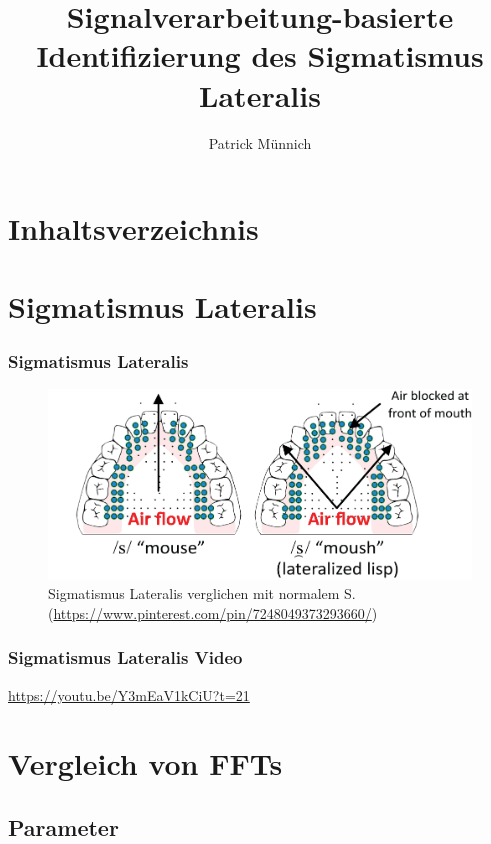 \documentclass[11pt]{beamer}
\author{Patrick M\"unnich}
\title{Signalverarbeitung-basierte Identifizierung des Sigmatismus Lateralis}
\institute{Hochschule D\"usseldorf}
\begin{document}
\begin{frame}
\titlepage
\end{frame}

\section{Inhaltsverzeichnis}

\begin{frame}
\tableofcontents
\end{frame}

\section{Sigmatismus Lateralis}

\begin{frame}
\frametitle{Sigmatismus Lateralis}
\begin{figure}
\includegraphics[scale=0.4]{lateral_lisp.png}
\caption{Sigmatismus Lateralis verglichen mit normalem S. (\url{https://www.pinterest.com/pin/7248049373293660/})}
\end{figure}
\end{frame}

\begin{frame}
\frametitle{Sigmatismus Lateralis Video}
\centering
\url{https://youtu.be/Y3mEaV1kCiU?t=21}
\end{frame}

\section{Vergleich von FFTs}

\subsection{Parameter}
\end{document}
